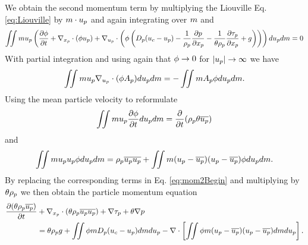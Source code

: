 We obtain the second momentum term by multiplying the Liouville Eq. \eqref{eq:Liouville} by $m \cdot u_p$ and again integrating over $m$ and \up
\begin{equation}
\label{eq:mom2Begin}
    \MultiIntegral{2} \m \up \left( \dfrac{\partial \pd}{\partial \tvar} + \nabla_{\xp} \cdot (\pd \up) + \nabla_{\up} \cdot \left(\pd
    \left(\d(\uf - \up) - \dfrac{1}{\rp} \dfrac{\partial \p}{\partial \xp} - \dfrac{1}{\pvf \rp} \dfrac{\partial \scs}{\partial \xp} + \g \right)
    \right)\right) d \up d \m = 0
\end{equation}
With partial integration and using again that $\phi \to 0$ for $\lvert u_p \rvert \to \infty$ we have
\begin{equation}
    \MultiIntegral{2} \m \up \nabla_{\up} \cdot (\pd \Ap ) d \up d \m = - \MultiIntegral{2} \m \Ap \pd d \up d \m.
\end{equation}
Using the mean particle velocity to reformulate
\begin{equation}
    \MultiIntegral{2} \m \up \dfrac{\partial \pd}{\partial \tvar} d \up d \m = \dfrac{\partial}{\partial \tvar} (\rp \pvf \overline{\up} )
\end{equation}
and
\begin{equation}
    \MultiIntegral{2} \m \up \up \pd d \up d \m = \rp \overline{\up} \overline{\up} + \MultiIntegral{2} \m (\up - \overline{\up}) ( \up - \overline{\up}) \pd d \up d \m.
\end{equation}
By replacing the corresponding terms in Eq. \eqref{eq:mom2Begin} and multiplying by $\theta \rho_p$ we then obtain the particle momentum equation
\begin{equation}
    \begin{aligned}
\label{eq:secondMomentum}
    \dfrac{\partial ( \pvf \rp \overline{\up})}{\partial t} &+ \nabla_{\xp} \cdot (\pvf \rp \overline{\up} \overline{\up} ) + \nabla \scs + \pvf \nabla \p \\ &= \pvf \rp \g + \MultiIntegral{2} \pd \m \d (\uf - \up) d \m d\up - \nabla \cdot \left[ \MultiIntegral{2} \pd \m (\up - \overline{\up}) (\up - \overline{\up}) d \m d \up \right].
    \end{aligned}
\end{equation}
